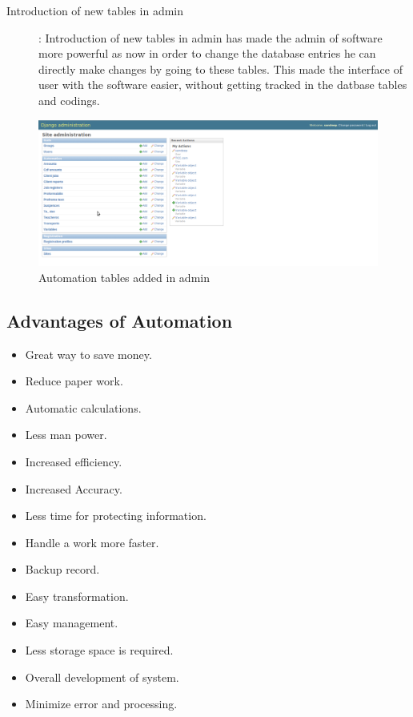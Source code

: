 \newpage
\begin{description}
\item[Introduction of new tables in admin] : Introduction of new tables in admin has made the admin of software more powerful as now in order to change the database entries he can directly make changes by going to these tables. This made the interface of user with the software easier, without getting tracked in the datbase tables and codings.
\end{description}
\begin{figure}[h]
\centering \includegraphics[scale=0.4]{s5.png}
\caption{Automation tables added in admin}
\end{figure}
\newpage
\subsection{Advantages of Automation}
\begin{itemize}
\item Great way to save money.
\item Reduce paper work.
\item Automatic calculations.
\item Less man power.
\item Increased efficiency.
\item Increased Accuracy.
\item Less time for protecting information.
\item Handle a work more faster.
\item Backup record.
\item Easy transformation.
\item Easy management.
\item Less storage space is required.
\item Overall development of system.
\item Minimize error and processing.
\end{itemize}
